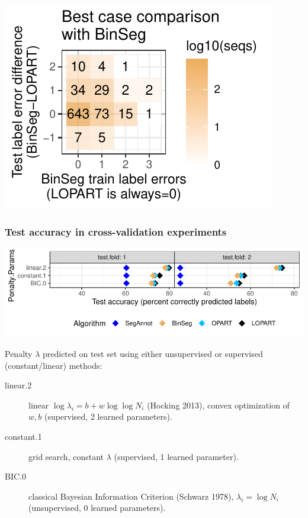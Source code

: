 \documentclass{beamer}
\begin{document}
\begin{frame}
  \includegraphics[width=\textwidth]{figure-label-errors-BinSeg}
\end{frame}

\begin{frame}
  \frametitle{Test accuracy in cross-validation experiments}
  \includegraphics[width=\textwidth]{figure-cv-BIC}

  Penalty $\lambda$ predicted on test set using either unsupervised or
  supervised (constant/linear) methods:

\begin{description}
\item[linear.2] linear $\log \lambda_i = b + w \log\log N_i$ (Hocking
  2013), convex optimization of $w,b$ (supervised, 2 learned
  parameters).
\item[constant.1] grid search, constant $\lambda$ (supervised, 1
  learned parameter).
\item[BIC.0] classical Bayesian Information Criterion (Schwarz 1978),
  $\lambda_i=\log N_i$ (unsupervised, 0 learned parameters).
\end{description}
  
\end{frame}
\end{document}
